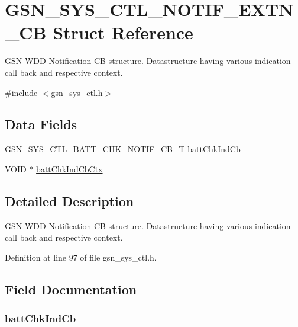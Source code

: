 \hypertarget{a00254}{
\section{GSN\_\-SYS\_\-CTL\_\-NOTIF\_\-EXTN\_\-CB Struct Reference}
\label{a00254}
}


GSN WDD Notification CB structure. Datastructure having various indication call back and respective context.  




{\ttfamily \#include $<$gsn\_\-sys\_\-ctl.h$>$}

\subsection*{Data Fields}
\begin{DoxyCompactItemize}
\item 
\hyperlink{a00592_af97ab705a1dd2c6de5dfc45aab9d47fe}{GSN\_\-SYS\_\-CTL\_\-BATT\_\-CHK\_\-NOTIF\_\-CB\_\-T} \hyperlink{a00254_aff96f1dee6ed8718e1700a542263cdb0}{battChkIndCb}
\item 
VOID $\ast$ \hyperlink{a00254_a0f343e3461047aff3e42c39c2370b116}{battChkIndCbCtx}
\end{DoxyCompactItemize}


\subsection{Detailed Description}
GSN WDD Notification CB structure. Datastructure having various indication call back and respective context. 

Definition at line 97 of file gsn\_\-sys\_\-ctl.h.



\subsection{Field Documentation}
\hypertarget{a00254_aff96f1dee6ed8718e1700a542263cdb0}{
\subsubsection[{battChkIndCb}]{ {\bf battChkIndCb}}}
\label{a00254_aff96f1dee6ed8718e1700a542263cdb0}


